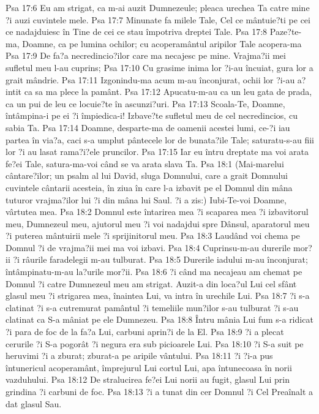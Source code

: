 Psa 17:6  Eu am strigat, ca m-ai auzit Dumnezeule; pleaca urechea Ta catre mine ?i auzi cuvintele mele.
Psa 17:7  Minunate fa milele Tale, Cel ce mântuie?ti pe cei ce nadajduiesc în Tine de cei ce stau împotriva dreptei Tale.
Psa 17:8  Paze?te-ma, Doamne, ca pe lumina ochilor; cu acoperamântul aripilor Tale acopera-ma
Psa 17:9  De fa?a necredincio?ilor care ma necajesc pe mine. Vrajma?ii mei sufletul meu l-au cuprins;
Psa 17:10  Cu grasime inima lor ?i-au încuiat, gura lor a grait mândrie.
Psa 17:11  Izgonindu-ma acum m-au înconjurat, ochii lor ?i-au a?intit ca sa ma plece la pamânt.
Psa 17:12  Apucatu-m-au ca un leu gata de prada, ca un pui de leu ce locuie?te în ascunzi?uri.
Psa 17:13  Scoala-Te, Doamne, întâmpina-i pe ei ?i împiedica-i! Izbave?te sufletul meu de cel necredincios, cu sabia Ta.
Psa 17:14  Doamne, desparte-ma de oamenii acestei lumi, ce-?i iau partea în via?a, caci s-a umplut pântecele lor de bunata?ile Tale; saturatu-s-au fiii lor ?i au lasat rama?i?ele pruncilor.
Psa 17:15  Iar eu întru dreptate ma voi arata fe?ei Tale, satura-ma-voi când se va arata slava Ta.
Psa 18:1  (Mai-marelui cântare?ilor; un psalm al lui David, sluga Domnului, care a grait Domnului cuvintele cântarii acesteia, în ziua în care l-a izbavit pe el Domnul din mâna tuturor vrajma?ilor lui ?i din mâna lui Saul. ?i a zis:) Iubi-Te-voi Doamne, vârtutea mea.
Psa 18:2  Domnul este întarirea mea ?i scaparea mea ?i izbavitorul meu, Dumnezeul meu, ajutorul meu ?i voi nadajdui spre Dânsul, aparatorul meu ?i puterea mântuirii mele ?i sprijinitorul meu.
Psa 18:3  Laudând voi chema pe Domnul ?i de vrajma?ii mei ma voi izbavi.
Psa 18:4  Cuprinsu-m-au durerile mor?ii ?i râurile faradelegii m-au tulburat.
Psa 18:5  Durerile iadului m-au înconjurat; întâmpinatu-m-au la?urile mor?ii.
Psa 18:6  ?i când ma necajeau am chemat pe Domnul ?i catre Dumnezeul meu am strigat. Auzit-a din loca?ul Lui cel sfânt glasul meu ?i strigarea mea, înaintea Lui, va intra în urechile Lui.
Psa 18:7  ?i s-a clatinat ?i s-a cutremurat pamântul ?i temeliile mun?ilor s-au tulburat ?i s-au clatinat ca S-a mâniat pe ele Dumnezeu.
Psa 18:8  Întru mânia Lui fum s-a ridicat ?i para de foc de la fa?a Lui, carbuni aprin?i de la El.
Psa 18:9  ?i a plecat cerurile ?i S-a pogorât ?i negura era sub picioarele Lui.
Psa 18:10  ?i S-a suit pe heruvimi ?i a zburat; zburat-a pe aripile vântului.
Psa 18:11  ?i ?i-a pus întunericul acoperamânt, împrejurul Lui cortul Lui, apa întunecoasa în norii vazduhului.
Psa 18:12  De stralucirea fe?ei Lui norii au fugit, glasul Lui prin grindina ?i carbuni de foc.
Psa 18:13  ?i a tunat din cer Domnul ?i Cel Preaînalt a dat glasul Sau.
